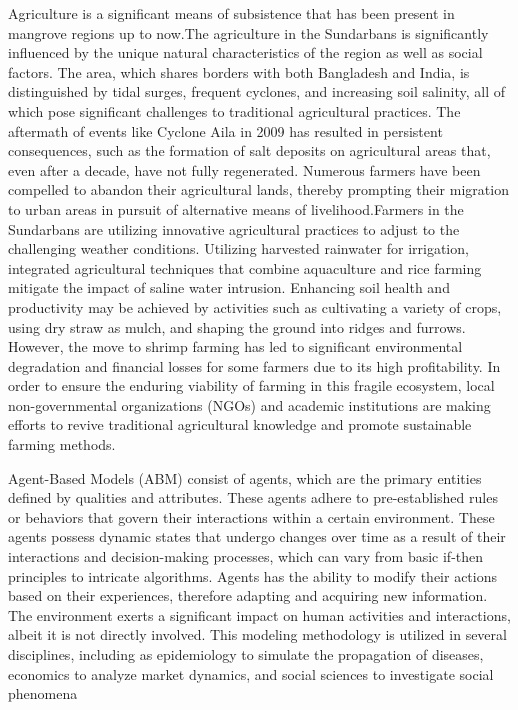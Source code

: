 \documentclass[final,5p,times,twocolumn,authoryear]{elsarticle}
\begin{document}
Agriculture is a significant means of subsistence that has been present in mangrove regions up to now.The agriculture in the Sundarbans is significantly influenced by the unique natural characteristics of the region as well as social factors. The area, which shares borders with both Bangladesh and India, is distinguished by tidal surges, frequent cyclones, and increasing soil salinity, all of which pose significant challenges to traditional agricultural practices. The aftermath of events like Cyclone Aila in 2009 has resulted in persistent consequences, such as the formation of salt deposits on agricultural areas that, even after a decade, have not fully regenerated. Numerous farmers have been compelled to abandon their agricultural lands, thereby prompting their migration to urban areas in pursuit of alternative means of livelihood.Farmers in the Sundarbans are utilizing innovative agricultural practices to adjust to the challenging weather conditions. Utilizing harvested rainwater for irrigation, integrated agricultural techniques that combine aquaculture and rice farming mitigate the impact of saline water intrusion. Enhancing soil health and productivity may be achieved by activities such as cultivating a variety of crops, using dry straw as mulch, and shaping the ground into ridges and furrows. However, the move to shrimp farming has led to significant environmental degradation and financial losses for some farmers due to its high profitability. In order to ensure the enduring viability of farming in this fragile ecosystem, local non-governmental organizations (NGOs) and academic institutions are making efforts to revive traditional agricultural knowledge and promote sustainable farming methods\cite{mongabay2020shrimp}\cite{mongabay2020salt}\cite{mongabay2020caught}\cite{engage4sundarbans2020}.\vspace{0.5cm}

Agent-Based Models (ABM) consist of agents, which are the primary entities defined by qualities and attributes. These agents adhere to pre-established rules or behaviors that govern their interactions within a certain environment. These agents possess dynamic states that undergo changes over time as a result of their interactions and decision-making processes, which can vary from basic if-then principles to intricate algorithms. Agents has the ability to modify their actions based on their experiences, therefore adapting and acquiring new information. The environment exerts a significant impact on human activities and interactions, albeit it is not directly involved. This modeling methodology is utilized in several disciplines, including as epidemiology to simulate the propagation of diseases, economics to analyze market dynamics, and social sciences to investigate social phenomena\cite{railsback2019agent}\cite{bonabeau2002agent}\cite{macal2010tutorial}
\end{document}
